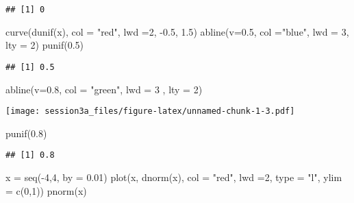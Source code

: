 \documentclass[
]{article}
\newenvironment{Shaded}{\begin{snugshade}}{\end{snugshade}}
\newcommand{\AttributeTok}[1]{\textcolor[rgb]{0.77,0.63,0.00}{#1}}
\newcommand{\DecValTok}[1]{\textcolor[rgb]{0.00,0.00,0.81}{#1}}
\newcommand{\FloatTok}[1]{\textcolor[rgb]{0.00,0.00,0.81}{#1}}
\newcommand{\FunctionTok}[1]{\textcolor[rgb]{0.00,0.00,0.00}{#1}}
\newcommand{\NormalTok}[1]{#1}
\newcommand{\OtherTok}[1]{\textcolor[rgb]{0.56,0.35,0.01}{#1}}
\newcommand{\SpecialCharTok}[1]{\textcolor[rgb]{0.00,0.00,0.00}{#1}}
\newcommand{\StringTok}[1]{\textcolor[rgb]{0.31,0.60,0.02}{#1}}
\begin{document}
\begin{verbatim}
## [1] 0
\end{verbatim}

\begin{Shaded}
\begin{Highlighting}[]
 \FunctionTok{curve}\NormalTok{(}\FunctionTok{dunif}\NormalTok{(x), }\AttributeTok{col =} \StringTok{"red"}\NormalTok{, }\AttributeTok{lwd =}\DecValTok{2}\NormalTok{, }\SpecialCharTok{{-}}\FloatTok{0.5}\NormalTok{, }\FloatTok{1.5}\NormalTok{) }
\FunctionTok{abline}\NormalTok{(}\AttributeTok{v=}\FloatTok{0.5}\NormalTok{, }\AttributeTok{col =}\StringTok{"blue"}\NormalTok{, }\AttributeTok{lwd =} \DecValTok{3}\NormalTok{, }\AttributeTok{lty =} \DecValTok{2}\NormalTok{) }
\FunctionTok{punif}\NormalTok{(}\FloatTok{0.5}\NormalTok{)}
\end{Highlighting}
\end{Shaded}

\begin{verbatim}
## [1] 0.5
\end{verbatim}

\begin{Shaded}
\begin{Highlighting}[]
\FunctionTok{abline}\NormalTok{(}\AttributeTok{v=}\FloatTok{0.8}\NormalTok{, }\AttributeTok{col =} \StringTok{"green"}\NormalTok{, }\AttributeTok{lwd =} \DecValTok{3}\NormalTok{ , }\AttributeTok{lty =} \DecValTok{2}\NormalTok{)}
\end{Highlighting}
\end{Shaded}

\texttt{[image: session3a\_files/figure-latex/unnamed-chunk-1-3.pdf]}

\begin{Shaded}
\begin{Highlighting}[]
\FunctionTok{punif}\NormalTok{(}\FloatTok{0.8}\NormalTok{)}
\end{Highlighting}
\end{Shaded}

\begin{verbatim}
## [1] 0.8
\end{verbatim}

\begin{Shaded}
\begin{Highlighting}[]
\NormalTok{x }\OtherTok{=} \FunctionTok{seq}\NormalTok{(}\SpecialCharTok{{-}}\DecValTok{4}\NormalTok{,}\DecValTok{4}\NormalTok{, }\AttributeTok{by =} \FloatTok{0.01}\NormalTok{)}
\FunctionTok{plot}\NormalTok{(x, }\FunctionTok{dnorm}\NormalTok{(x), }\AttributeTok{col =} \StringTok{"red"}\NormalTok{, }\AttributeTok{lwd =}\DecValTok{2}\NormalTok{,}
     \AttributeTok{type =} \StringTok{"l"}\NormalTok{, }\AttributeTok{ylim =} \FunctionTok{c}\NormalTok{(}\DecValTok{0}\NormalTok{,}\DecValTok{1}\NormalTok{))}
\FunctionTok{pnorm}\NormalTok{(x)}
\end{Highlighting}
\end{Shaded}
\end{document}
